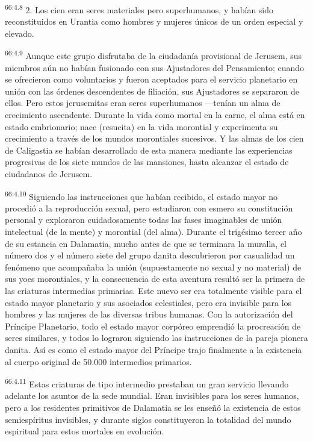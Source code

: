 \par
\textsuperscript{66:4.8} 2. Los cien eran seres materiales pero superhumanos, y habían sido reconstituidos en Urantia como hombres y mujeres únicos de un orden especial y elevado.

\par
\textsuperscript{66:4.9} Aunque este grupo disfrutaba de la ciudadanía provisional de Jerusem, sus miembros aún no habían fusionado con sus Ajustadores del Pensamiento; cuando se ofrecieron como voluntarios y fueron aceptados para el servicio planetario en unión con las órdenes descendentes de filiación, sus Ajustadores se separaron de ellos. Pero estos jerusemitas eran seres superhumanos ---tenían un alma de crecimiento ascendente. Durante la vida como mortal en la carne, el alma está en estado embrionario; nace (resucita) en la vida morontial y experimenta su crecimiento a través de los mundos morontiales sucesivos. Y las almas de los cien de Caligastia se habían desarrollado de esta manera mediante las experiencias progresivas de los siete mundos de las mansiones, hasta alcanzar el estado de ciudadanos de Jerusem.

\par
\textsuperscript{66:4.10} Siguiendo las instrucciones que habían recibido, el estado mayor no procedió a la reproducción sexual, pero estudiaron con esmero su constitución personal y exploraron cuidadosamente todas las fases imaginables de unión intelectual (de la mente) y morontial (del alma). Durante el trigésimo tercer año de su estancia en Dalamatia, mucho antes de que se terminara la muralla, el número dos y el número siete del grupo danita descubrieron por casualidad un fenómeno que acompañaba la unión (supuestamente no sexual y no material) de sus yoes morontiales, y la consecuencia de esta aventura resultó ser la primera de las criaturas intermedias primarias. Este nuevo ser era totalmente visible para el estado mayor planetario y sus asociados celestiales, pero era invisible para los hombres y las mujeres de las diversas tribus humanas. Con la autorización del Príncipe Planetario, todo el estado mayor corpóreo emprendió la procreación de seres similares, y todos lo lograron siguiendo las instrucciones de la pareja pionera danita. Así es como el estado mayor del Príncipe trajo finalmente a la existencia al cuerpo original de 50.000 intermedios primarios.

\par
\textsuperscript{66:4.11} Estas criaturas de tipo intermedio prestaban un gran servicio llevando adelante los asuntos de la sede mundial. Eran invisibles para los seres humanos, pero a los residentes primitivos de Dalamatia se les enseñó la existencia de estos semiespíritus invisibles, y durante siglos constituyeron la totalidad del mundo espiritual para estos mortales en evolución.

